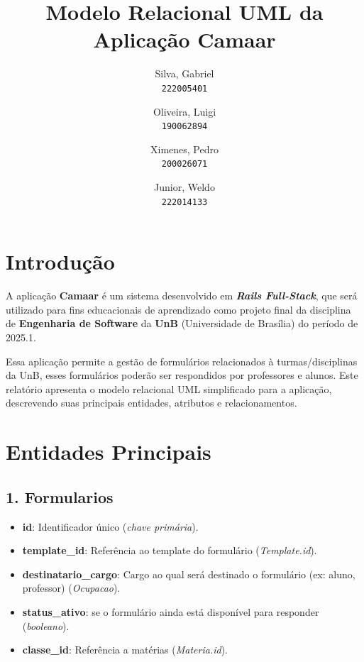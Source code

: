 \documentclass[a4paper,12pt]{article}
\title{Modelo Relacional UML da Aplicação Camaar}
\author{
  Silva, Gabriel\\
  \texttt{222005401}
  \and
  Oliveira, Luigi\\
  \texttt{190062894}
  \and
  Ximenes, Pedro\\
  \texttt{200026071}
  \and
  Junior, Weldo\\
  \texttt{222014133}
}
\date{}
\begin{document}
 
\maketitle

\section*{Introdução}

A aplicação \textbf{Camaar} é um sistema desenvolvido em \textbf{\textit{Rails Full-Stack}}, que será utilizado para fins educacionais de aprendizado como projeto final da disciplina de \textbf{Engenharia de Software} da \textbf{UnB} (Universidade de Brasília) do período de 2025.1. 

Essa aplicação permite a gestão de formulários relacionados à turmas/disciplinas da UnB, esses formulários poderão ser respondidos por professores e alunos. Este relatório apresenta o modelo relacional UML simplificado para a aplicação, descrevendo suas principais entidades, atributos e relacionamentos.
 
 
\section*{Entidades Principais}
 
\subsection*{1. Formularios}

\begin{itemize}

    \item \textbf{id}: Identificador único (\textit{chave primária}).

    \item \textbf{template\_id}: Referência ao template do formulário (\textit{Template.id}).

    \item \textbf{destinatario\_cargo}: Cargo ao qual será destinado o formulário (ex: aluno, professor) (\textit{Ocupacao}).

    \item \textbf{status\_ativo}: se o formulário ainda está disponível para responder (\textit{booleano}).

    \item \textbf{classe\_id}: Referência a matérias (\textit{Materia.id}).

\end{itemize}
\end{document}
